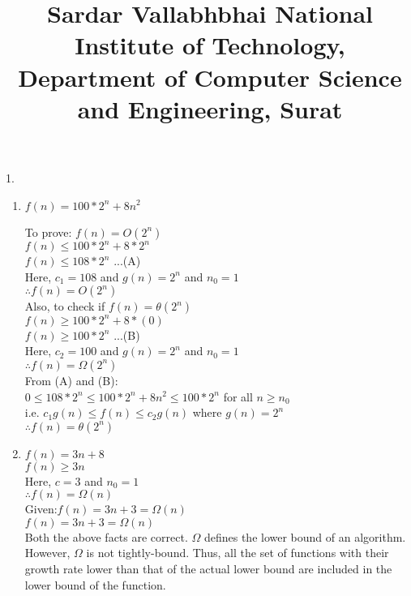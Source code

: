 \documentclass[12pt, a4paper]{article}
\title{Sardar Vallabhbhai National Institute of Technology,  Department of Computer Science and Engineering, Surat}
\begin{document}
	
	\maketitle

	1.
	\begin{enumerate}[label=(\alph*)]
		\item $f(n) = 100 * 2^n + 8n^2$
		
		To prove: $f(n) = O(2^n)$ \\
		
		$f(n) \leq 100 * 2^n + 8 * 2^n$\\
		$f(n) \leq 108 * 2^n$\hspace{2cm} ...(A)\\
		Here, $c_1=108$ and $g(n)=2^n$ and $n_0=1$         \\
		\boldmath$\therefore f(n)= O(2^n)$\unboldmath\\
		
		Also, to check if $f(n)= \theta(2^n)$\\
		
		$f(n) \geq 100 * 2^n + 8 * (0)$\\
		$f(n) \geq 100 * 2^n$\hspace{2cm} ...(B)\\
		Here, $c_2=100$ and $g(n)=2^n$  and $n_0=1$       \\
		\boldmath$\therefore f(n)= \Omega(2^n)$\unboldmath\\
		
		From (A) and (B):\\
		$0 \leq 108 * 2^n \leq 100 * 2^n + 8n^2 \leq 100 * 2^n$
		for all $n \geq n_0$\\
		i.e. $c_1g(n)\leq f(n) \leq c_2g(n)$    \hspace{2cm}where $g(n) = 2^n$ \\
		\boldmath$\therefore f(n)= \theta(2^n)$\unboldmath\\
		
		
		
		\item 
		$f(n) = 3n + 8$\\
		$f(n) \geq 3n$ \\
		Here, $c=3$ and $n_0=1$\\
		\boldmath$\therefore f(n)= \Omega(n)$\unboldmath\\
		
		Given:$f(n)=3n + 3=\Omega(n)$\\
		$f(n)=3n + 3=\Omega(n)$\\
		Both the above facts are correct. $\Omega$ defines the lower bound of an algorithm. However, $\Omega$ is not tightly-bound. Thus, all the set of functions with their growth rate lower than that of the actual lower bound are included in the lower bound of the function.\\
		

\end{enumerate}
\end{document}
